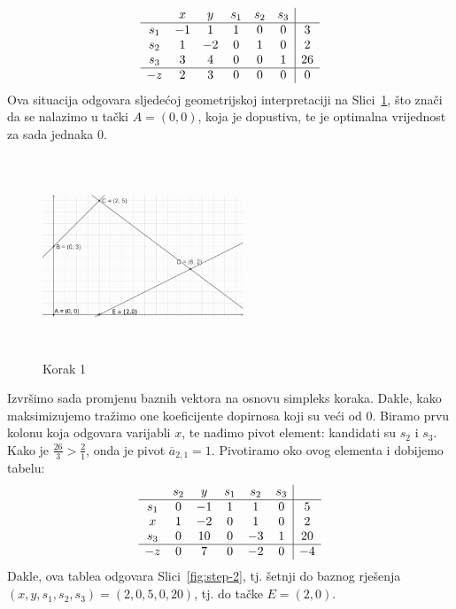 \documentclass[a4paper, utf8, 11pt, colorlinks]{book}
\begin{document}
$$\begin{array}{cccccc| c}
        & x & y & s_1 & s_2 & s_3 & \\ \hline
   s_1  & -1 & 1 & 1 & 0 & 0 & 3 \\
   s_2  & 1 & -2 & 0 & 1 & 0 & 2 \\
   s_3  & 3 & 4 & 0 & 0 & 1 & 26 \\ \hline
    -z  & 2 & 3 & 0 & 0 & 0 & 0 \\
\end{array}
$$ 
Ova situacija odgovara sljedećoj geometrijskoj interpretaciji na Slici~\ref{fig:step-1}, što znači da se nalazimo u tački $A=(0,0)$, koja je dopustiva, te je optimalna vrijednost za sada jednaka 0. 
\begin{figure}[H]
	\centering
	\includegraphics[width=170pt, height=170pt]{simpleks-primjer-2-sl1.eps}
	\caption{Korak 1}
	\label{fig:step-1}
\end{figure}

Izvršimo sada promjenu baznih vektora na osnovu simpleks koraka. Dakle, kako maksimizujemo 
tražimo one koeficijente dopirnosa koji su veći od 0. Biramo prvu kolonu koja odgovara varijabli $x$, te nađimo 
pivot element: kandidati su $s_2$ i $s_3$. Kako je $\frac{26}{3} > \frac{2}{1}$, onda je  pivot $\overline{a}_{2, 1} = 1$. Pivotiramo oko ovog elementa i dobijemo tabelu:
$$\begin{array}{cccccc| c}
       & s_2  & y  & s_1  & s_2 & s_3 &    \\ \hline
   s_1 & 0    & -1  & 1  & 1 & 0  &  5     \\
   x   & 1    & -2  & 0  & 1 & 0  &  2     \\
   s_3 & 0    & 10   &  0  & -3 & 1 & 20   \\ \hline
   -z  & 0    &  7   & 0   & -2 & 0 & -4   \\ 
\end{array}
$$ 
Dakle, ova tablea odgovara Slici~\ref{fig:step-2}, tj. šetnji do baznog rješenja $(x,y, s_1, s_2, s_3)=(2, 0, 5, 0 ,20)$, tj. do tačke $E=(2, 0)$. 
\end{document}
